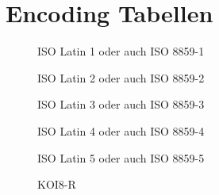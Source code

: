 \chapter{Encoding Tabellen}
\label{EncodingTabellen}

\begin{figure}[h]
	\caption{ISO Latin 1 oder auch ISO 8859-1}
	\label{isolatin1}
\end{figure}

\begin{figure}[h]
	\caption{ISO Latin 2 oder auch ISO 8859-2}
	\label{isolatin2}
\end{figure}

\begin{figure}[h]
	\caption{ISO Latin 3 oder auch ISO 8859-3}
	\label{isolatin3}
\end{figure}

\begin{figure}[h]
	\caption{ISO Latin 4 oder auch ISO 8859-4}
	\label{isolatin4}
\end{figure}

\begin{figure}[h]
	\caption{ISO Latin 5 oder auch ISO 8859-5}
	\label{isolatin5}
\end{figure}

\begin{figure}[h]
	\caption{KOI8-R}
	\label{koi8-r}
\end{figure}

